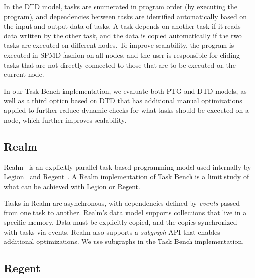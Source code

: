 In the DTD model, tasks are enumerated in program order (by
executing the program), and dependencies between tasks are
identified automatically based on the input and output data of tasks. 
A task depends on another task if it reads data written by the other task,
and the data is copied automatically if the two tasks are executed on
different nodes. To
improve scalability, the program is executed in
SPMD fashion on all nodes, and the user is responsible for eliding
tasks that are not directly connected to those that are to be executed
on the current node.

In our Task Bench implementation, we evaluate both PTG and DTD models,
as well as a third option based on DTD that has additional manual
optimizations applied to further reduce dynamic checks for what tasks
should be executed on a node, which further improves
scalability.


\subsection{Realm}

Realm~\cite{Realm14} is an explicitly-parallel task-based programming
model used internally by Legion~\cite{Legion12} and
Regent~\cite{Regent15}. A Realm implementation of Task Bench is a limit study of what can be achieved with Legion or Regent.

Tasks in Realm are asynchronous, with dependencies
defined by \emph{events} passed from one task
to another. Realm's data model supports collections that live in a
specific memory. Data must be explicitly copied, and the copies
synchronized with tasks via events.
Realm also supports a \emph{subgraph} API that enables additional
optimizations. We use subgraphs in the Task
Bench implementation.

\subsection{Regent}

